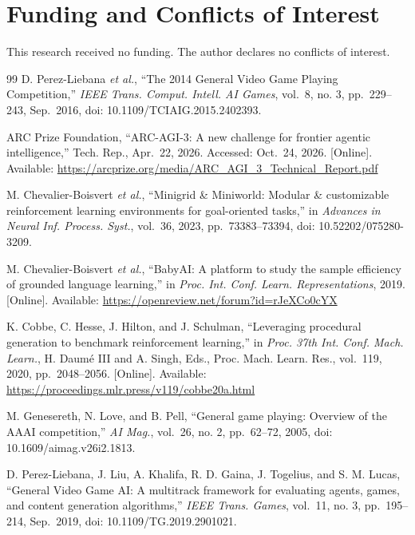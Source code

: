 \documentclass[journal]{IEEEtran}
\begin{document}
\section*{Funding and Conflicts of
Interest}\label{funding-and-conflicts-of-interest}

This research received no funding. The author declares no conflicts of
interest.

\begin{thebibliography}{99}
D. Perez-Liebana \emph{et al.}, ``The 2014 General Video Game Playing
Competition,'' \emph{IEEE Trans. Comput. Intell. AI Games}, vol.~8, no.
3, pp.~229--243, Sep.~2016, doi: 10.1109/TCIAIG.2015.2402393.

ARC Prize Foundation, ``ARC-AGI-3: A new challenge for frontier agentic
intelligence,'' Tech. Rep., Apr.~22, 2026. Accessed: Oct.~24, 2026.
{[}Online{]}. Available:
\url{https://arcprize.org/media/ARC_AGI_3_Technical_Report.pdf}

M. Chevalier-Boisvert \emph{et al.}, ``Minigrid \& Miniworld: Modular \&
customizable reinforcement learning environments for goal-oriented
tasks,'' in \emph{Advances in Neural Inf. Process. Syst.}, vol.~36,
2023, pp.~73383--73394, doi: 10.52202/075280-3209.

M. Chevalier-Boisvert \emph{et al.}, ``BabyAI: A platform to study the
sample efficiency of grounded language learning,'' in \emph{Proc. Int.
Conf. Learn. Representations}, 2019. {[}Online{]}. Available:
\url{https://openreview.net/forum?id=rJeXCo0cYX}

K. Cobbe, C. Hesse, J. Hilton, and J. Schulman, ``Leveraging procedural
generation to benchmark reinforcement learning,'' in \emph{Proc. 37th
Int. Conf. Mach. Learn.}, H. Daumé III and A. Singh, Eds., Proc. Mach.
Learn. Res., vol.~119, 2020, pp.~2048--2056. {[}Online{]}. Available:
\url{https://proceedings.mlr.press/v119/cobbe20a.html}

M. Genesereth, N. Love, and B. Pell, ``General game playing: Overview of
the AAAI competition,'' \emph{AI Mag.}, vol.~26, no. 2, pp.~62--72,
2005, doi: 10.1609/aimag.v26i2.1813.

D. Perez-Liebana, J. Liu, A. Khalifa, R. D. Gaina, J. Togelius, and S.
M. Lucas, ``General Video Game AI: A multitrack framework for evaluating
agents, games, and content generation algorithms,'' \emph{IEEE Trans.
Games}, vol.~11, no. 3, pp.~195--214, Sep.~2019, doi:
10.1109/TG.2019.2901021.


\end{thebibliography}
\end{document}
